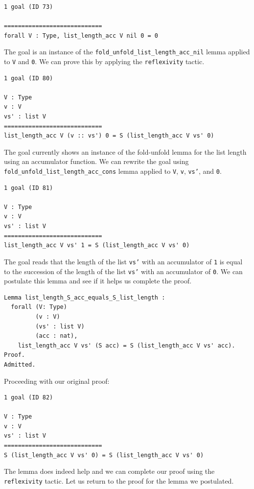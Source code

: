 \documentclass{article}
\begin{document}
\begin{lstlisting}
1 goal (ID 73)

============================
forall V : Type, list_length_acc V nil 0 = 0
\end{lstlisting}

The goal is an instance of the \texttt{fold\_unfold\_list\_length\_acc\_nil} lemma applied to \texttt{V} and \texttt{0}. We can prove this by applying the \texttt{reflexivity} tactic.

\begin{lstlisting}
1 goal (ID 80)

V : Type
v : V
vs' : list V
============================
list_length_acc V (v :: vs') 0 = S (list_length_acc V vs' 0)
\end{lstlisting}

The goal currently shows an instance of the fold-unfold lemma for the list length using an accumulator function. We can rewrite the goal using \texttt{fold\_unfold\_list\_length\_acc\_cons} lemma applied to \texttt{V}, \texttt{v}, \texttt{vs'}, and \texttt{0}.

\begin{lstlisting}
1 goal (ID 81)

V : Type
v : V
vs' : list V
============================
list_length_acc V vs' 1 = S (list_length_acc V vs' 0)
\end{lstlisting}

The goal reads that the length of the list \texttt{vs'} with an accumulator of \texttt{1} is equal to the succession of the length of the list \texttt{vs'} with an accumulator of \texttt{0}. We can postulate this lemma and see if it helps us complete the proof.

\begin{lstlisting}
Lemma list_length_S_acc_equals_S_list_length : 
  forall (V: Type)
         (v : V)
         (vs' : list V)
         (acc : nat),
    list_length_acc V vs' (S acc) = S (list_length_acc V vs' acc).
Proof.
Admitted.
\end{lstlisting}

Proceeding with our original proof:

\begin{lstlisting}
1 goal (ID 82)

V : Type
v : V
vs' : list V
============================
S (list_length_acc V vs' 0) = S (list_length_acc V vs' 0)
\end{lstlisting}

The lemma does indeed help and we can complete our proof using the \texttt{reflexivity} tactic. Let us return to the proof for the lemma we postulated.
\end{document}
